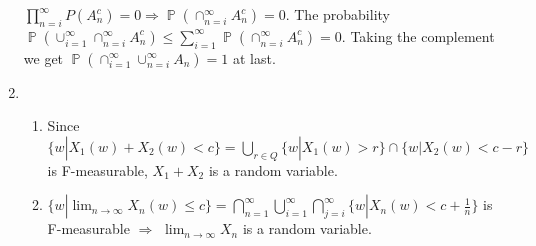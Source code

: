 \documentclass{article}
\DeclareMathOperator{\bP}{\mathbb{P}}
\begin{document}
\begin{enumerate}
$\prod_{n=i}^{\infty} P(A_n^c)=0 \Rightarrow \bP(\cap_{n=i}^{\infty} A_n^c) = 0$.
The probability
$\bP(\cup_{i=1}^{\infty}\cap_{n=i}^{\infty}A_n^c) 
\leq \sum_{i=1}^{\infty} \bP(\cap_{n=i}^{\infty}A_n^c)
= 0$. Taking the complement we get $\bP(\cap_{i=1}^{\infty} \cup_{n=i}^{\infty} A_n ) 
=1$ at last.
\item
\begin{enumerate}
    \item Since $\{w | X_1(w) + X_2(w) < c\}=\bigcup_{r\in Q}
    \{w|X_1(w) > r\} \cap \{w|X_2(w) < c-r\}$ is F-measurable,
    $X_1+X_2$ is a random variable.
    \item $\{w|\lim_{n\to \infty} X_n(w) \leq c\} = \bigcap_{n=1}^{\infty} \bigcup_{i=1}^{\infty} \bigcap_{j=i}^{\infty} \{w|X_n(w) < c + \frac{1}{n}\}$
    is F-measurable $\Rightarrow$ $\lim_{n\to\infty} X_n$
    is a random variable.
\end{enumerate}

\end{enumerate}
\end{document}
